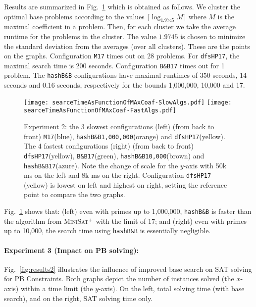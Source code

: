 \documentclass[envcountsame]{llncs}
\newcommand\minisatp{\textsc{MiniSat$^+$}}
\begin{document}
Results are summarized in Fig.~\ref{fig:results1} which is obtained
as follows. We cluster the optimal base problems according to the
values $\lceil \log_{1.9745} M \rceil$ where $M$ is the maximal
coefficient in a problem. Then, for each cluster we take the average
runtime for the problems in the cluster. The value $1.9745$ is chosen
to minimize the standard deviation from the averages (over all
clusters). These are the points on the graphs.
Configuration \texttt{M17} times out on 28
problems.  For \texttt{dfsHP17}, the maximal search time is 200
seconds.  Configuration \texttt{B\&B17} times out for 1 problem.  The
\texttt{hashB\&B} configurations have maximal runtimes of 350 seconds,
14 seconds and 0.16 seconds, respectively for the bounds 1,000,000,
10,000 and 17.
\begin{figure}
  \centering
  \vspace{-3ex}
  \texttt{[image: searceTimeAsFunctionOfMAxCoaf-SlowAlgs.pdf]}
  \texttt{[image: searceTimeAsFunctionOfMAxCoaf-FastAlgs.pdf]}
  \vspace{-3ex}
\caption{Experiment 2: the 3 slowest configurations (left)
    (from back to front)
    \texttt{M17}(blue), \texttt{hashB\&B1,000,000}(orange) and
    \texttt{dfsHP17}(yellow).  
The 4 fastest configurations (right) (from back to front)
    \texttt{dfsHP17}(yellow), \texttt{B\&B17}(green),
    \texttt{hashB\&B10,000}(brown) and \texttt{hashB\&B17}(azure).
Note the change of scale for the $y$-axis with 50k ms on the left
    and 8k ms on the right. Configuration \texttt{dfsHP17} (yellow) is
    lowest on left and highest on right, setting the reference point
    to compare the two graphs. \vspace{-5mm}}

\label{fig:results1}
\vspace{-1ex}
\end{figure}


Fig.~\ref{fig:results1} shows  that: (left)  even with primes
up to 1,000,000, \texttt{hashB\&B} is faster than the algorithm from
\minisatp\ with the limit of 17; and
(right)  even with primes
up to 10,000, the search time using \texttt{hashB\&B} is essentially
negligible.







\paragraph{Experiment 3 (Impact on PB solving):}
Fig.~\ref{fig:results2} illustrates the influence of improved base
search on SAT solving for PB Constraints. Both graphs
depict the number of instances solved (the $x$-axis) within a
time limit (the $y$-axis). On the left, total solving time
(with base search), and on the right, SAT solving time only.
\end{document}
